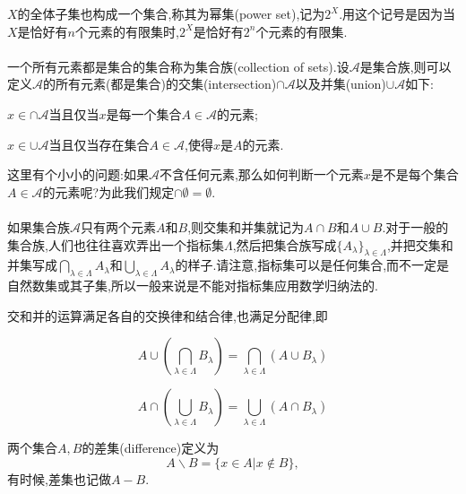 $X$的全体子集也构成一个集合,称其为幂集(power set),记为$2^X$.用这个记号是因为当$X$是恰好有$n$个元素的有限集时,$2^X$是恰好有$2^n$个元素的有限集.
\\ \hspace*{\fill} \\%
一个所有元素都是集合的集合称为集合族(collection of sets).设$\mathcal{A}$是集合族,则可以定义$\mathcal{A}$的所有元素(都是集合)的交集(intersection)$\cap\mathcal{A}$以及并集(union)$\cup\mathcal{A}$如下:
\begin{blist}
	\item $x\in\cap\mathcal{A}$当且仅当$x$是每一个集合$A\in\mathcal{A}$的元素;
	\item $x\in\cup\mathcal{A}$当且仅当存在集合$A\in\mathcal{A}$,使得$x$是$A$的元素.
\end{blist}




这里有个小小的问题:如果$\mathcal{A}$不含任何元素,那么如何判断一个元素$x$是不是每个集合$A\in\mathcal{A}$的元素呢?为此我们规定$\cap\emptyset = \emptyset$.
\\ \hspace*{\fill} \\%
如果集合族$\mathcal{A}$只有两个元素$A$和$B$,则交集和并集就记为$A\cap B$和$A\cup B$.对于一般的集合族,人们也往往喜欢弄出一个指标集$\Lambda$,然后把集合族写成$\{A_{\lambda}\}_{\lambda\in\Lambda}$,并把交集和并集写成$\bigcap_{\lambda\in\Lambda}A_{\lambda}$和$\bigcup_{\lambda\in\Lambda}A_{\lambda}$的样子.请注意,指标集可以是任何集合,而不一定是自然数集或其子集,所以一般来说是不能对指标集应用数学归纳法的.



交和并的运算满足各自的交换律和结合律,也满足分配律,即
\begin{blist}
	\item \begin{equation}
	A\cup\left(\bigcap_{\lambda\in\Lambda}B_{\lambda} \right) = \bigcap_{\lambda\in\Lambda} \left(A\cup B_{\lambda} \right)
	\end{equation}
	\item \begin{equation}
	A\cap\left(\bigcup_{\lambda\in\Lambda}B_{\lambda} \right) = \bigcup_{\lambda\in\Lambda} \left(A\cap B_{\lambda} \right)
	\end{equation}
\end{blist}
两个集合$A,B$的差集(difference)定义为\begin{equation}
A\backslash B = \{x\in A|x\notin B \},
\end{equation}
有时候,差集也记做$A-B$.



